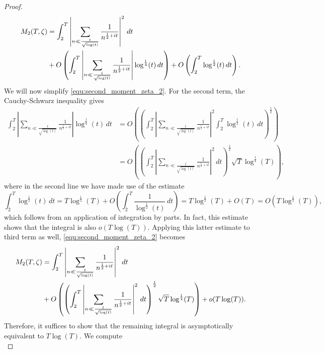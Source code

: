 \begin{proof}
\begin{equation}
        \begin{aligned}
          M_{2}(T,\zeta) &= \int_{2}^{T}\left|\sum_{n \ll \frac{t}{\sqrt{\log(t)}}}\frac{1}{n^{\frac{1}{2}+it}}\right|^{2}\,dt \\
          &+ O\left(\int_{2}^{T}\left|\sum_{n \ll \frac{t}{\sqrt{\log(t)}}}\frac{1}{n^{\frac{1}{2}+it}}\right|\log^{\frac{1}{4}}(t)\,dt\right)+O\left(\int_{2}^{T}\log^{\frac{1}{2}}(t)\,dt\right).
        \end{aligned}
      \end{equation}
      We will now simplify \cref{equ:second_moment_zeta_2}. For the second term, the Cauchy-Schwarz inequality gives
      \begin{align*}
        \int_{2}^{T}\left|\sum_{n \ll \frac{t}{\sqrt{\log(t)}}}\frac{1}{n^{\frac{1}{2}+it}}\right|\log^{\frac{1}{4}}(t)\,dt &= O\left(\left(\int_{2}^{T}\left|\sum_{n \ll \frac{t}{\sqrt{\log(t)}}}\frac{1}{n^{\frac{1}{2}+it}}\right|^{2}\int_{2}^{T}\log^{\frac{1}{2}}(t)\,dt\right)^{\frac{1}{2}}\right) \\
        &= O\left(\left(\int_{2}^{T}\left|\sum_{n \ll \frac{t}{\sqrt{\log(t)}}}\frac{1}{n^{\frac{1}{2}+it}}\right|^{2}\,dt\right)^{\frac{1}{2}}\sqrt{T}\log^{\frac{1}{4}}(T)\right),
      \end{align*}
      where in the second line we have made use of the estimate
      \[
        \int_{2}^{T}\log^{\frac{1}{2}}(t)\,dt = T\log^{\frac{1}{2}}(T)+O\left(\int_{2}^{T}\frac{1}{\log^{\frac{1}{2}}(t)}\,dt\right) = T\log^{\frac{1}{2}}(T)+O(T) = O(T\log^{\frac{1}{2}}(T)),
      \]
      which follows from an application of integration by parts. In fact, this estimate shows that the integral is also $o(T\log(T))$. Applying this latter estimate to third term as well, \cref{equ:second_moment_zeta_2} becomes
      \begin{equation}\label{equ:second_moment_zeta_3}
        \begin{aligned}
          M_{2}(T,\zeta) &= \int_{2}^{T}\left|\sum_{n \ll \frac{t}{\sqrt{\log(t)}}}\frac{1}{n^{\frac{1}{2}+it}}\right|^{2}\,dt \\
          &+ O\left(\left(\int_{2}^{T}\left|\sum_{n \ll \frac{t}{\sqrt{\log(t)}}}\frac{1}{n^{\frac{1}{2}+it}}\right|^{2}\,dt\right)^{\frac{1}{2}}\sqrt{T}\log^{\frac{1}{4}}(T)\right)+o(T\log(T)).
        \end{aligned}
      \end{equation}
      Therefore, it suffices to show that the remaining integral is asymptotically equivalent to $T\log(T)$. We compute
      \begin{equation}\label{equ:second_moment_zeta_4}

\end{equation}
\end{proof}
